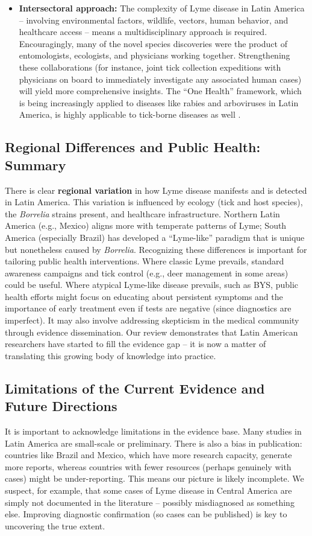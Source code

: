 \documentclass[11pt,letterpaper]{article}
\begin{document}
\begin{itemize}
    \item \textbf{Intersectoral approach:} The complexity of Lyme disease in Latin America – involving environmental factors, wildlife, vectors, human behavior, and healthcare access – means a multidisciplinary approach is required. Encouragingly, many of the novel species discoveries were the product of entomologists, ecologists, and physicians working together. Strengthening these collaborations (for instance, joint tick collection expeditions with physicians on board to immediately investigate any associated human cases) will yield more comprehensive insights. The “One Health” framework, which is being increasingly applied to diseases like rabies and arboviruses in Latin America, is highly applicable to tick-borne diseases as well \citep{Colunga-Salas2022e, Colunga-Salas2022f}.
\end{itemize}

\subsection{Regional Differences and Public Health: Summary}
There is clear \textbf{regional variation} in how Lyme disease manifests and is detected in Latin America. This variation is influenced by ecology (tick and host species), the \textit{Borrelia} strains present, and healthcare infrastructure. Northern Latin America (e.g., Mexico) aligns more with temperate patterns of Lyme; South America (especially Brazil) has developed a “Lyme-like” paradigm that is unique but nonetheless caused by \textit{Borrelia}. Recognizing these differences is important for tailoring public health interventions. Where classic Lyme prevails, standard awareness campaigns and tick control (e.g., deer management in some areas) could be useful. Where atypical Lyme-like disease prevails, such as BYS, public health efforts might focus on educating about persistent symptoms and the importance of early treatment even if tests are negative (since diagnostics are imperfect). It may also involve addressing skepticism in the medical community through evidence dissemination. Our review demonstrates that Latin American researchers have started to fill the evidence gap – it is now a matter of translating this growing body of knowledge into practice.

\subsection{Limitations of the Current Evidence and Future Directions}
It is important to acknowledge limitations in the evidence base. Many studies in Latin America are small-scale or preliminary. There is also a bias in publication: countries like Brazil and Mexico, which have more research capacity, generate more reports, whereas countries with fewer resources (perhaps genuinely with cases) might be under-reporting. This means our picture is likely incomplete. We suspect, for example, that some cases of Lyme disease in Central America are simply not documented in the literature – possibly misdiagnosed as something else. Improving diagnostic confirmation (so cases can be published) is key to uncovering the true extent.
\end{document}
